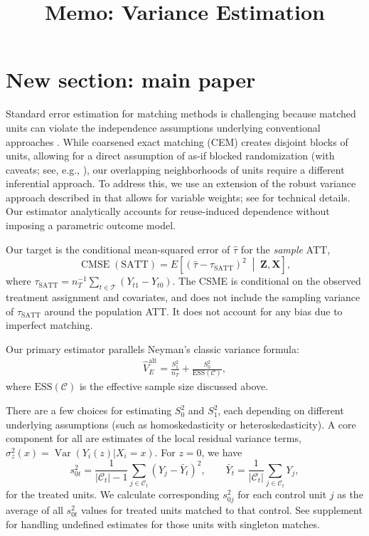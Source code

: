 \documentclass[11pt]{article}
\title{Memo: Variance Estimation}
\author{}
\date{}
\newcommand{\Ct}{\mathcal{C}_t}
\newcommand{\Var}{\operatorname{Var}}
\begin{document}
\maketitle

\section{New section: main paper}


Standard error estimation for matching methods is challenging because matched units can violate the independence assumptions underlying conventional approaches \citep{abadie2006large}.
While coarsened exact matching (CEM) creates disjoint blocks of units, allowing for a direct assumption of as-if blocked randomization (with caveats; see, e.g., \citealp{pashley2021conditional}), our overlapping neighborhoods of units require a different inferential approach.
To address this, we use an extension of the robust variance approach described in \citet{abadie2006large} that allows for variable weights; see  \citet{meng2025varianceestimationmatchingreweighting} for technical details.
Our estimator analytically accounts for reuse-induced dependence without imposing a parametric outcome model.

Our target is the conditional mean-squared error of $\hat\tau$ for the \emph{sample} ATT,
\[
  \operatorname{CMSE}(\mathrm{SATT})
  = E\!\left[(\hat\tau - \tau_{\mathrm{SATT}})^2 \;\middle|\; \mathbf{Z},\mathbf{X}\right],
\]
where $\tau_{\mathrm{SATT}} = n_T^{-1}\sum_{t\in\mathcal{T}}(Y_{t1}-Y_{t0})$.
The CSME is conditional on the observed treatment assignment and covariates, and does not include the sampling variance of $\tau_{\mathrm{SATT}}$ around the population ATT.
It does not account for any bias due to imperfect matching.

Our primary estimator parallels Neyman's classic variance formula:
\begin{align}
  \label{eq:plug-in-variance-estimator-naive}
  \hat{V}_E^{\text{alt}}
  = \frac{S^2_1}{n_T} + \frac{S^2_0}{\mathrm{ESS}(\mathcal{C})} ,
\end{align}
where $\mathrm{ESS}(\mathcal{C})$ is the effective sample size discussed above.

There are a few choices for estimating $S_0^2$ and $S_1^2$, each depending on different underlying assumptions (such as homoskedasticity or heteroskedasticity).
A core component for all are estimates of the local residual variance terms, $\sigma^2_{z}(x) = \Var( Y_i(z) |X_i=x)$.
For $z=0$, we have
\[
s_{0t}^2 = \frac{1}{|\Ct|-1}\sum_{j\in\Ct}\left(Y_j-\bar{Y}_t\right)^2,
\qquad
\bar{Y}_t=\frac{1}{|\Ct|}\sum_{j\in\Ct}Y_j, 
\]
for the treated units.
We calculate corresponding $s_{0j}^2$ for each control unit $j$ as the average of all $s_{0t}^2$ values for treated units matched to that control.
See supplement for handling undefined estimates for those units with singleton matches.
\end{document}
